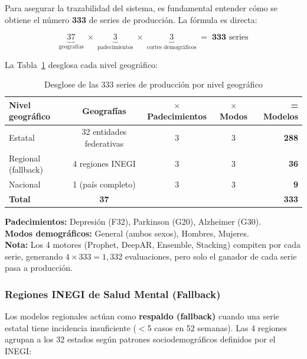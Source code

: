 \documentclass[12pt, letterpaper]{article}
\newcommand{\tabref}[1]{Tabla~\ref{#1}}
\begin{document}
Para asegurar la trazabilidad del sistema, es fundamental entender cómo se obtiene el número \textbf{333} de series de producción. La fórmula es directa:

\begin{equation}
\underbrace{37}_{\text{geografías}} \;\times\; \underbrace{3}_{\text{padecimientos}} \;\times\; \underbrace{3}_{\text{cortes demográficos}} \;=\; \mathbf{333} \text{ series}
\end{equation}

La \tabref{tab:composicion333} desglosa cada nivel geográfico:

\begin{table}[H]
\centering
\caption{Desglose de las 333 series de producción por nivel geográfico}
\label{tab:composicion333}
\small
\begin{tabular}{l c c c r}
\toprule
\textbf{Nivel geográfico} & \textbf{Geografías} & \textbf{$\times$ Padecimientos} & \textbf{$\times$ Modos} & \textbf{= Modelos} \\
\midrule
\rowcolor{lightgreen!15}
Estatal             & 32 entidades federativas & 3 & 3 & \textbf{288} \\
Regional (fallback) & 4 regiones INEGI         & 3 & 3 & \textbf{36}  \\
Nacional            & 1 (país completo)        & 3 & 3 & \textbf{9}   \\
\midrule
\textbf{Total}      & \textbf{37}              &   &   & \textbf{333} \\
\bottomrule
\end{tabular}
\vspace{0.2cm}

{\scriptsize
\textbf{Padecimientos:} Depresión (F32), Parkinson (G20), Alzheimer (G30). \\
\textbf{Modos demográficos:} General (ambos sexos), Hombres, Mujeres. \\
\textbf{Nota:} Los 4 motores (Prophet, DeepAR, Ensemble, Stacking) compiten por cada serie, generando $4 \times 333 = 1{,}332$ evaluaciones, pero solo el ganador de cada serie pasa a producción.
}
\end{table}

\subsubsection*{Regiones INEGI de Salud Mental (Fallback)}

Los modelos regionales actúan como \textbf{respaldo (fallback)} cuando una serie estatal tiene incidencia insuficiente ($<$5 casos en 52 semanas). Las 4 regiones agrupan a los 32 estados según patrones sociodemográficos definidos por el INEGI:
\end{document}
